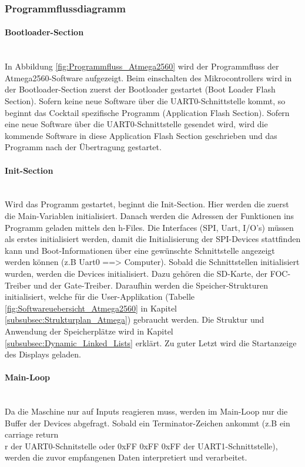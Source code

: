 \subsubsection{Programmflussdiagramm}
\label{subsubsec:Programmflussdiagramm}

\paragraph{Bootloader-Section}\mbox{}\\
In Abbildung \ref{fig:Programmfluss_Atmega2560} wird der Programmfluss der Atmega2560-Software aufgezeigt. Beim einschalten des Mikrocontrollers wird in der Bootloader-Section zuerst der Bootloader gestartet (Boot Loader Flash Section). Sofern keine neue Software über die UART0-Schnittstelle kommt, so beginnt das Cocktail spezifische Programm (Application Flash Section). Sofern eine neue Software über die UART0-Schnittstelle gesendet wird, wird die kommende Software in diese Application Flash Section geschrieben und das Programm nach der Übertragung gestartet.

\paragraph{Init-Section}\mbox{}\\
Wird das Programm gestartet, beginnt die Init-Section. Hier werden die zuerst die Main-Variablen initialisiert. Danach werden die Adressen der Funktionen ins Programm geladen mittels den h-Files. Die Interfaces (SPI, Uart, I/O's) müssen als erstes initialisiert werden, damit die Initialisierung der SPI-Devices stattfinden kann und Boot-Informationen über eine gewünschte Schnittstelle angezeigt werden können (z.B Uart0 ==> Computer). Sobald die Schnittstellen initialisiert wurden, werden die Devices initialisiert. Dazu gehören die SD-Karte, der FOC-Treiber und der Gate-Treiber. Daraufhin werden die Speicher-Strukturen initialisiert, welche für die User-Applikation (Tabelle \ref{fig:Softwareuebersicht_Atmega2560} in Kapitel \ref{subsubsec:Strukturplan_Atmega}) gebraucht werden. Die Struktur und Anwendung der Speicherplätze wird in Kapitel \ref{subsubsec:Dynamic_Linked_Lists} erklärt. Zu guter Letzt wird die Startanzeige des Displays geladen.


\paragraph{Main-Loop}\mbox{}\\
Da die Maschine nur auf Inputs reagieren muss, werden im Main-Loop nur die Buffer der Devices abgefragt. Sobald ein Terminator-Zeichen ankommt (z.B ein carriage return \\r der UART0-Schnitstelle oder 0xFF 0xFF 0xFF der UART1-Schnittstelle), werden die zuvor empfangenen Daten interpretiert und verarbeitet.


